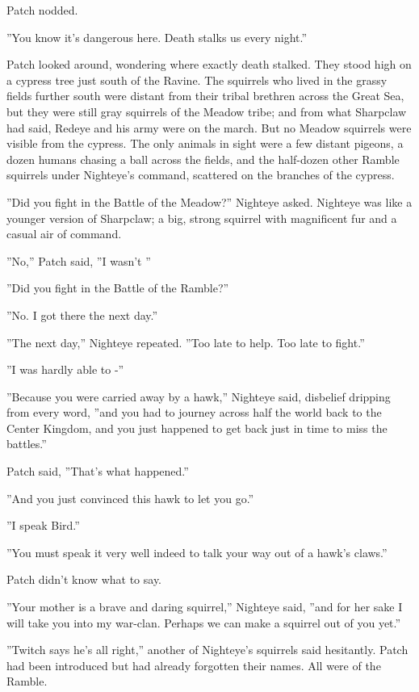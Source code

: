 \documentclass[11pt]{article}
\begin{document}
 Patch nodded.\par
 ''You know it's dangerous here. Death stalks us every night.''\par
 Patch looked around, wondering where exactly death stalked. They stood high on a cypress tree just south of the Ravine. The squirrels who lived in the grassy fields further south were distant from their tribal brethren across the Great Sea, but they were still gray squirrels of the Meadow tribe; and from what Sharpclaw had said, Redeye and his army were on the march. But no Meadow squirrels were visible from the cypress. The only animals in sight were a few distant pigeons, a dozen humans chasing a ball across the fields, and the half-dozen other Ramble squirrels under Nighteye's command, scattered on the branches of the cypress.\par
 ''Did you fight in the Battle of the Meadow?'' Nighteye asked. Nighteye was like a younger version of Sharpclaw; a big, strong squirrel with magnificent fur and a casual air of command.\par
 ''No,'' Patch said, ''I wasn't %
''\par
 ''Did you fight in the Battle of the Ramble?''\par
 ''No. I got there the next day.''\par
 ''The next day,'' Nighteye repeated. ''Too late to help. Too late to fight.''\par
 ''I was hardly able to -''\par
 ''Because you were carried away by a hawk,'' Nighteye said, disbelief dripping from every word, ''and you had to journey across half the world back to the Center Kingdom, and you just happened to get back just in time to miss the battles.''\par
 Patch said, ''That's what happened.''\par
 ''And you just convinced this hawk to let you go.''\par
 ''I speak Bird.''\par
 ''You must speak it very well indeed to talk your way out of a hawk's claws.''\par
 Patch didn't know what to say.\par
 ''Your mother is a brave and daring squirrel,'' Nighteye said, ''and for her sake I will take you into my war-clan. Perhaps we can make a squirrel out of you yet.''\par
 ''Twitch says he's all right,'' another of Nighteye's squirrels said hesitantly. Patch had been introduced but had already forgotten their names. All were of the Ramble.\par
\end{document}
